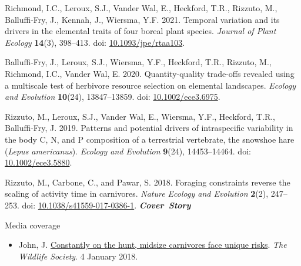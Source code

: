 \documentclass[11pt, letterpaper]{awesome-cv}
\begin{document}
\begin{etaremune}[topsep=0pt,itemsep=1pt,partopsep=0pt,parsep=0pt]
  \item Richmond, I.C., Leroux, S.J., Vander Wal, E., Heckford, T.R., \textcolor{awesome}{Rizzuto, M.}, Balluffi-Fry, J., Kennah, J., Wiersma, Y.F. 2021. Temporal variation and its drivers in the elemental traits of four boreal plant species. \emph{Journal of Plant Ecology} \textbf{14}(3), 398--413. doi: \href{https://doi.org/10.1093/jpe/rtaa103}{10.1093/jpe/rtaa103}.
  \item Balluffi-Fry, J., Leroux, S.J., Wiersma, Y.F., Heckford, T.R., \textcolor{awesome}{Rizzuto, M.}, Richmond, I.C., Vander Wal, E. 2020. Quantity-quality trade-offs revealed using a multiscale test of herbivore resource selection on elemental landscapes. \emph{Ecology and Evolution} \textbf{10}(24), 13847--13859. doi: \href{https://doi.org/10.1002/ece3.6975}{10.1002/ece3.6975}.
  \item \textcolor{awesome}{Rizzuto, M.}, Leroux, S.J., Vander Wal, E., Wiersma, Y.F., Heckford, T.R., Balluffi-Fry, J. 2019. Patterns and potential drivers of intraspecific variability in the body C, N, and P composition of a terrestrial vertebrate, the snowshoe hare (\textit{Lepus americanus}). \textit{Ecology and Evolution} \textbf{9}(24), 14453--14464. doi: \href{https://doi.org/10.1002/ece3.5880}{10.1002/ece3.5880}.
  \item \textcolor{awesome}{Rizzuto, M.}, Carbone, C., and Pawar, S. 2018. Foraging constraints reverse the scaling of activity time in carnivores. \emph{Nature Ecology and Evolution} \textbf{2}(2), 247--253. doi: \href{https://doi.org/10.1038/s41559-017-0386-1}{10.1038/s41559-017-0386-1}. \null\hfill\textbf{\textit{Cover~Story}}
  \vspace{.3em}
  \begin{description}
    \item[\bodyfontlight Media coverage]
  \end{description}
  \begin{itemize}
      \item John, J. \href{https://wildlife.org/constantly-on-the-hunt-midsize-carnivores-face-unique-risks/}{Constantly on the hunt, midsize carnivores face unique risks}. \emph{The Wildlife Society}. 4 January 2018.
  \end{itemize}
\end{etaremune}


\end{document}
